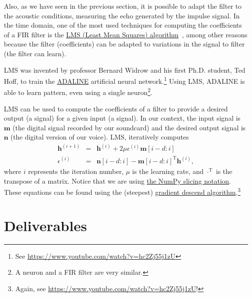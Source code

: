 Also, as we have seen in the previous section, it is possible to adapt
the filter to the acoustic conditions, measuring the echo generated by
the impulse signal. In the time domain, one of the most used
techniques for computing the coefficients of a FIR filter is the
\href{https://en.wikipedia.org/wiki/Least_mean_squares_filter}{LMS
  (Least Mean Squares)
  algorithm}~\cite{haykin1995adaptive,boyd2004convex}, among other
reasons because the filter (coefficients) can be adapted to variations
in the signal to filter (the filter can learn).

LMS was invented by professor Bernard Widrow and his first
Ph.D. student, Ted Hoff, to train the
\href{https://en.wikipedia.org/wiki/ADALINE}{ADALINE} artificial
neural network.\footnote{See
  \url{https://www.youtube.com/watch?v=hc2Zj55j1zU}} Using LMS,
ADALINE is able to learn pattern, even using a single
neuron\footnote{A neuron and a FIR filter are very similar.}.

LMS can be used to compute the coefficients of a filter to provide a
desired output (a signal) for a given input (a signal). In our
context, the input signal is ${\mathbf m}$ (the digital signal
recorded by our soundcard) and the desired output signal is
${\mathbf n}$ (the digital version of our voice). LMS, iteratively
computes
\begin{eqnarray}
  {\mathbf h}^{(i+1)} & = & {\mathbf h}^{(i)} + 2\mu\epsilon^{(i)}{\mathbf m}[i-d:i] \\
  \epsilon^{(i) }& = & {\mathbf n}[i-d:i] - {\mathbf m}[i-d:i]^\mathrm{T}{\mathbf h}^{(i)},
\end{eqnarray}
where $i$ represents the iteration number, $\mu$ is the learning rate,
and $\cdot^\mathrm{T}$ is the transpose of a matrix. Notice that we
are using
\href{https://numpy.org/doc/stable/user/basics.indexing.html}{the
  NumPy slicing notation}. These equations can be found using the
(steepest)
\href{https://en.wikipedia.org/wiki/Gradient_descent}{gradient descend
  algorithm}.\footnote{Again, see
  \url{https://www.youtube.com/watch?v=hc2Zj55j1zU}!}

\section{Deliverables}

